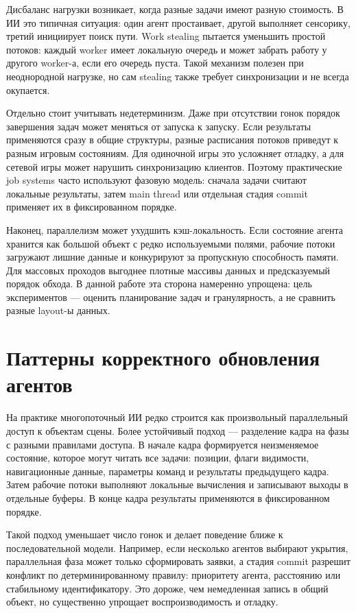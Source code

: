 \documentclass[14pt,a4paper,oneside]{extreport}
\begin{document}
Дисбаланс нагрузки возникает, когда разные задачи имеют разную стоимость. В ИИ это типичная ситуация: один агент простаивает, другой выполняет сенсорику, третий инициирует поиск пути. Work stealing пытается уменьшить простой потоков: каждый worker имеет локальную очередь и может забрать работу у другого worker-а, если его очередь пуста. Такой механизм полезен при неоднородной нагрузке, но сам stealing также требует синхронизации и не всегда окупается.

Отдельно стоит учитывать недетерминизм. Даже при отсутствии гонок порядок завершения задач может меняться от запуска к запуску. Если результаты применяются сразу в общие структуры, разные расписания потоков приведут к разным игровым состояниям. Для одиночной игры это усложняет отладку, а для сетевой игры может нарушить синхронизацию клиентов. Поэтому практические job systems часто используют фазовую модель: сначала задачи считают локальные результаты, затем main thread или отдельная стадия commit применяет их в фиксированном порядке.

Наконец, параллелизм может ухудшить кэш-локальность. Если состояние агента хранится как большой объект с редко используемыми полями, рабочие потоки загружают лишние данные и конкурируют за пропускную способность памяти. Для массовых проходов выгоднее плотные массивы данных и предсказуемый порядок обхода. В данной работе эта сторона намеренно упрощена: цель экспериментов --- оценить планирование задач и гранулярность, а не сравнить разные layout-ы данных.

\section{Паттерны корректного обновления агентов}

На практике многопоточный ИИ редко строится как произвольный параллельный доступ к объектам сцены. Более устойчивый подход --- разделение кадра на фазы с разными правилами доступа. В начале кадра формируется неизменяемое состояние, которое могут читать все задачи: позиции, флаги видимости, навигационные данные, параметры команд и результаты предыдущего кадра. Затем рабочие потоки выполняют локальные вычисления и записывают выходы в отдельные буферы. В конце кадра результаты применяются в фиксированном порядке.

Такой подход уменьшает число гонок и делает поведение ближе к последовательной модели. Например, если несколько агентов выбирают укрытия, параллельная фаза может только сформировать заявки, а стадия commit разрешит конфликт по детерминированному правилу: приоритету агента, расстоянию или стабильному идентификатору. Это дороже, чем немедленная запись в общий объект, но существенно упрощает воспроизводимость и отладку.
\end{document}
